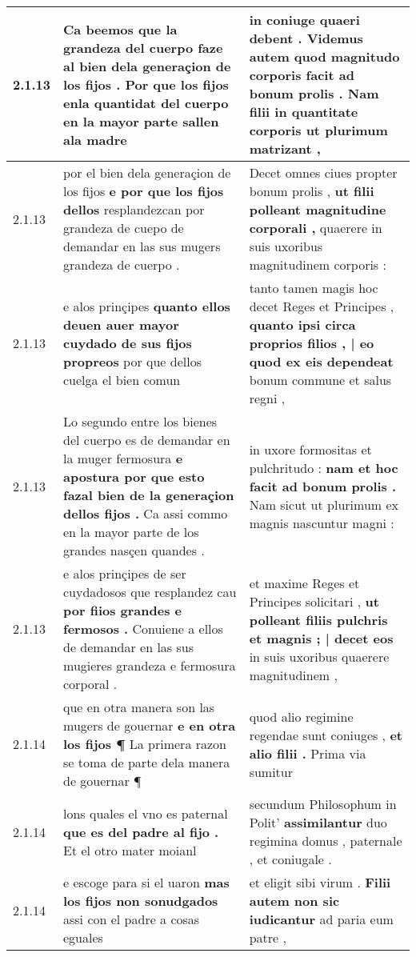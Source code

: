 \begin{tabular}{|p{1cm}|p{6.5cm}|p{6.5cm}|}
2.1.13 & Ca beemos que la grandeza del cuerpo faze al bien dela generaçion de los fijos . \textbf{ Por que los fijos enla quantidat del cuerpo } en la mayor parte sallen ala madre & in coniuge quaeri debent . Videmus autem quod magnitudo corporis facit ad bonum prolis . \textbf{ Nam filii in quantitate corporis } ut plurimum matrizant , \\\hline
2.1.13 & por el bien dela generaçion de los fijos \textbf{ e por que los fijos dellos } resplandezcan por grandeza de cuepo de demandar en las sus mugers grandeza de cuerpo . & Decet omnes ciues propter bonum prolis , \textbf{ ut filii polleant magnitudine corporali , } quaerere in suis uxoribus magnitudinem corporis : \\\hline
2.1.13 & e alos prinçipes \textbf{ quanto ellos deuen auer mayor cuydado de sus fijos propreos } por que dellos cuelga el bien comun & tanto tamen magis hoc decet Reges et Principes , \textbf{ quanto ipsi circa proprios filios , | eo quod ex eis dependeat } bonum commune et salus regni , \\\hline
2.1.13 & Lo segundo entre los bienes del cuerpo es de demandar en la muger fermosura \textbf{ e apostura por que esto fazal bien de la generaçion dellos fijos . } Ca assi commo en la mayor parte de los grandes nasçen quandes . & in uxore formositas et pulchritudo : \textbf{ nam et hoc facit ad bonum prolis . } Nam sicut ut plurimum ex magnis nascuntur magni : \\\hline
2.1.13 & e alos prinçipes de ser cuydadosos que resplandez cau \textbf{ por fiios grandes e fermosos . } Conuiene a ellos de demandar en las sus mugieres grandeza e fermosura corporal . & et maxime Reges et Principes solicitari , \textbf{ ut polleant filiis pulchris et magnis ; | decet eos } in suis uxoribus quaerere magnitudinem , \\\hline
2.1.14 & que en otra manera son las mugers de gouernar \textbf{ e en otra los fijos ¶ } La primera razon se toma de parte dela manera de gouernar ¶ & quod alio regimine regendae sunt coniuges , \textbf{ et alio filii . } Prima via sumitur \\\hline
2.1.14 & lons quales el vno es paternal \textbf{ que es del padre al fijo . } Et el otro mater moianl & secundum Philosophum in Polit’ \textbf{ assimilantur } duo regimina domus , paternale , et coniugale . \\\hline
2.1.14 & e escoge para si el uaron \textbf{ mas los fijos non sonudgados } assi con el padre a cosas eguales & et eligit sibi virum . \textbf{ Filii autem non sic iudicantur } ad paria eum patre , \\\hline

\end{tabular}
